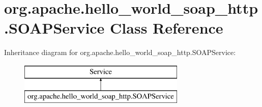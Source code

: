 \hypertarget{classorg_1_1apache_1_1hello__world__soap__http_1_1_s_o_a_p_service}{}\section{org.\+apache.\+hello\+\_\+world\+\_\+soap\+\_\+http.\+S\+O\+A\+P\+Service Class Reference}
\label{classorg_1_1apache_1_1hello__world__soap__http_1_1_s_o_a_p_service}
Inheritance diagram for org.\+apache.\+hello\+\_\+world\+\_\+soap\+\_\+http.\+S\+O\+A\+P\+Service\+:\begin{figure}[H]
\begin{center}
\leavevmode
\includegraphics[height=2.000000cm]{classorg_1_1apache_1_1hello__world__soap__http_1_1_s_o_a_p_service}
\end{center}
\end{figure}
